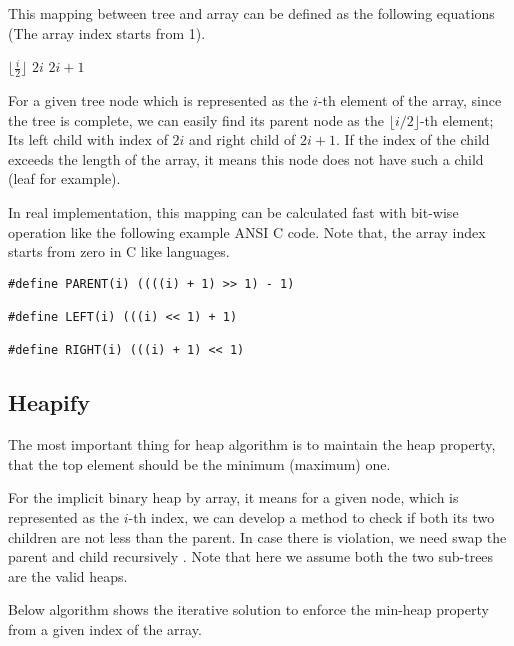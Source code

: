 \documentclass{article}
\begin{document}
This mapping between tree and array can be defined as
the following equations (The array index starts from 1).

\begin{algorithmic}[1]
  \State \Return $\lfloor \frac{i}{2} \rfloor$
\EndFunction
\Statex
{}
  \State \Return $2i$
\EndFunction
\Statex
{}
  \State \Return $2i+1$
\EndFunction
\end{algorithmic}

For a given tree node which is represented as the $i$-th element of the
array, since the tree is complete, we can easily find its parent node
as the $\lfloor i/2 \rfloor$-th element; Its left child
with index of $2i$ and right child of $2i+1$. If the index
of the child exceeds the length of the array, it means this
node does not have such a child (leaf for example).

In real implementation, this mapping can be calculated fast
with bit-wise operation like the following example ANSI C code.
Note that, the array index starts from zero in C like
languages.

\lstset{language=C}
\begin{lstlisting}
#define PARENT(i) ((((i) + 1) >> 1) - 1)

#define LEFT(i) (((i) << 1) + 1)

#define RIGHT(i) (((i) + 1) << 1)
\end{lstlisting}

\subsection{Heapify}

The most important thing for heap algorithm is to maintain the heap
property, that the top element should be the minimum (maximum) one.

For the implicit binary heap by array, it means for a given node,
which is represented as the $i$-th index, we can develop a method
to check if both its two children are not less than the parent. In case
there is violation, we need swap the parent and child recursively \cite{CLRS}.
Note that here we assume both the two sub-trees are the valid heaps.

Below algorithm shows the iterative solution to enforce the min-heap
property from a given index of the array.
\end{document}
